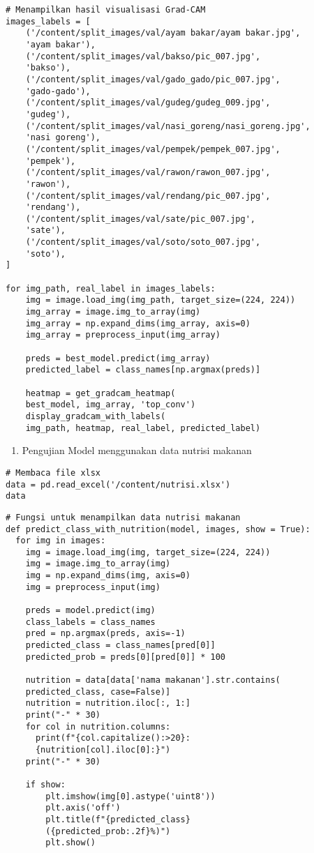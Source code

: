 \begin{lstlisting}[style=customc]
# Menampilkan hasil visualisasi Grad-CAM
images_labels = [
    ('/content/split_images/val/ayam bakar/ayam bakar.jpg', 
    'ayam bakar'),
    ('/content/split_images/val/bakso/pic_007.jpg', 
    'bakso'),
    ('/content/split_images/val/gado_gado/pic_007.jpg', 
    'gado-gado'),
    ('/content/split_images/val/gudeg/gudeg_009.jpg', 
    'gudeg'),
    ('/content/split_images/val/nasi_goreng/nasi_goreng.jpg', 
    'nasi goreng'),
    ('/content/split_images/val/pempek/pempek_007.jpg', 
    'pempek'),
    ('/content/split_images/val/rawon/rawon_007.jpg', 
    'rawon'),
    ('/content/split_images/val/rendang/pic_007.jpg', 
    'rendang'),
    ('/content/split_images/val/sate/pic_007.jpg', 
    'sate'),
    ('/content/split_images/val/soto/soto_007.jpg', 
    'soto'),
]

for img_path, real_label in images_labels:
    img = image.load_img(img_path, target_size=(224, 224))
    img_array = image.img_to_array(img)
    img_array = np.expand_dims(img_array, axis=0)
    img_array = preprocess_input(img_array)

    preds = best_model.predict(img_array)
    predicted_label = class_names[np.argmax(preds)]

    heatmap = get_gradcam_heatmap(
    best_model, img_array, 'top_conv')
    display_gradcam_with_labels(
    img_path, heatmap, real_label, predicted_label)
\end{lstlisting}

\begin{enumerate}[label=\alph*., start=8]
    \item Pengujian Model menggunakan data nutrisi makanan
\end{enumerate}

\begin{lstlisting}[style=customc]
# Membaca file xlsx
data = pd.read_excel('/content/nutrisi.xlsx')
data
\end{lstlisting}

\begin{lstlisting}[style=customc]
# Fungsi untuk menampilkan data nutrisi makanan
def predict_class_with_nutrition(model, images, show = True):
  for img in images:
    img = image.load_img(img, target_size=(224, 224))
    img = image.img_to_array(img)
    img = np.expand_dims(img, axis=0)
    img = preprocess_input(img)

    preds = model.predict(img)
    class_labels = class_names
    pred = np.argmax(preds, axis=-1)
    predicted_class = class_names[pred[0]]
    predicted_prob = preds[0][pred[0]] * 100

    nutrition = data[data['nama makanan'].str.contains(
    predicted_class, case=False)]
    nutrition = nutrition.iloc[:, 1:]
    print("-" * 30)
    for col in nutrition.columns:
      print(f"{col.capitalize():>20}: 
      {nutrition[col].iloc[0]:}")
    print("-" * 30)

    if show:
        plt.imshow(img[0].astype('uint8'))
        plt.axis('off')
        plt.title(f"{predicted_class} 
        ({predicted_prob:.2f}%)")
        plt.show()
\end{lstlisting}

